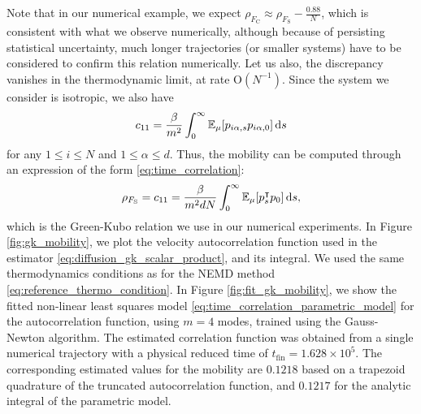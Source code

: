 Note that in our numerical example, we expect $\rho_{F_{\mathrm{C}}}\approx \rho_{F_{\mathrm{S}}}-\frac{0.88}{N}$, which is consistent with what we observe numerically, although because of persisting statistical uncertainty, much longer trajectories (or smaller systems) have to be considered to confirm this relation numerically.
Let us also, the discrepancy vanishes in the thermodynamic limit, at rate $\mathrm{O}(N^{-1})$.
Since the system we consider is isotropic, we also have 
\[c_{11}=\frac{\beta}{m^2}\int_0^\infty\mathbb{E}_\mu[p_{i\alpha,s}p_{i\alpha,0}]\,\mathrm{d} s\]
for any $1\leq i\leq N$ and $1\leq \alpha\leq d$. Thus, the mobility can be computed through an expression of the form \eqref{eq:time_correlation}:
\begin{equation}
    \label{eq:diffusion_gk_scalar_product}
    \rho_{F_{\mathrm{S}}}=c_{11}=\frac{\beta}{m^2 d N}\int_{0}^\infty \mathbb{E}_\mu[p_s^\intercal p_0]\,\mathrm{d} s,
\end{equation}
which is the Green-Kubo relation we use in our numerical experiments. 
In Figure \ref{fig:gk_mobility}, we plot the velocity autocorrelation function used in the estimator \eqref{eq:diffusion_gk_scalar_product}, and its integral. 
We used the same thermodynamics conditions as for the NEMD method \eqref{eq:reference_thermo_condition}. 
In Figure \ref{fig:fit_gk_mobility}, we show the fitted non-linear least squares model \eqref{eq:time_correlation_parametric_model} for the autocorrelation function, using $m=4$ modes, trained using the Gauss-Newton algorithm.
The estimated correlation function was obtained from a single numerical trajectory with a physical reduced time of $t_{\mathrm{fin}}=1.628 \times 10^5$.
The corresponding estimated values for the mobility are $0.1218$ based on a trapezoid quadrature of the truncated autocorrelation function, and $0.1217$ for the analytic integral of the parametric model.


